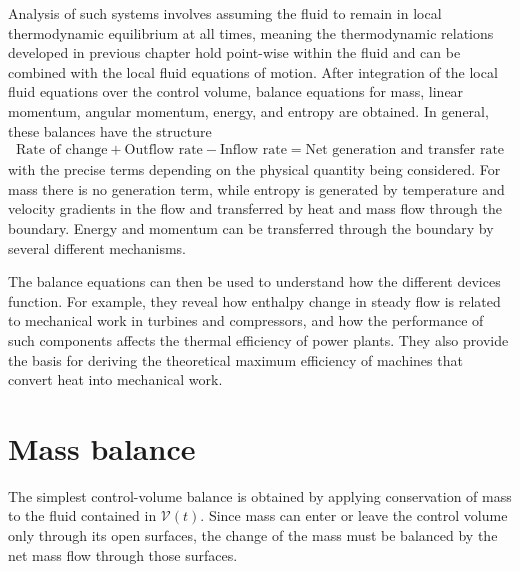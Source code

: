 Analysis of such systems involves assuming the fluid to remain in local thermodynamic equilibrium at all times, meaning the thermodynamic relations developed in previous chapter hold point-wise within the fluid and can be combined with the local fluid equations of motion. After integration of the local fluid equations over the control volume, balance equations for mass, linear momentum, angular momentum, energy, and entropy are obtained. In general, these balances have the structure
\begin{align}
    \text{Rate of change} + \text{Outflow rate} - \text{Inflow rate} = \text{Net generation and transfer rate}
\end{align}
with the precise terms depending on the physical quantity being considered. For mass there is no generation term, while entropy is generated by temperature and velocity gradients in the flow and transferred by heat and mass flow through the boundary. Energy and momentum can be transferred through the boundary by several different mechanisms.

The balance equations can then be used to understand how the different devices function. For example, they reveal how enthalpy change in steady flow is related to mechanical work in turbines and compressors, and how the performance of such components affects the thermal efficiency of power plants. They also provide the basis for deriving the theoretical maximum efficiency of machines that convert heat into mechanical work.


\section{Mass balance}
The simplest control-volume balance is obtained by applying conservation of mass to the fluid contained in $\mathcal{V}(t)$. Since mass can enter or leave the control volume only through its open surfaces, the change of the mass must be balanced by the net mass flow through those surfaces. 

